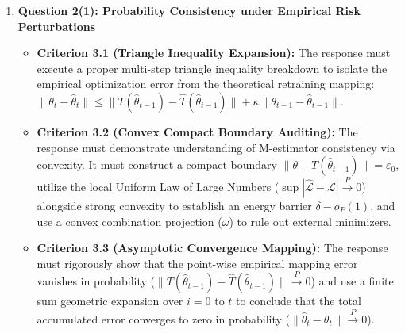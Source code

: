 \documentclass[../../../main.tex]{subfiles}
\begin{document}
\begin{msbproblem}
\begin{gradingscheme}
\begin{enumerate}[label=\arabic*.]
\item \textbf{Question 2(1): Probability Consistency under Empirical Risk Perturbations}
\begin{itemize}
\item \textbf{Criterion 3.1 (Triangle Inequality Expansion):} The response must execute a proper multi-step triangle inequality breakdown to isolate the empirical optimization error from the theoretical retraining mapping: $\|\theta_t-\widehat\theta_t\| \le \|T(\widehat\theta_{t-1})-\widehat T(\widehat\theta_{t-1})\| + \kappa\|\theta_{t-1}-\widehat\theta_{t-1}\|$.
\item \textbf{Criterion 3.2 (Convex Compact Boundary Auditing):} The response must demonstrate understanding of M-estimator consistency via convexity. It must construct a compact boundary $\|\theta-T(\widehat\theta_{t-1})\|=\varepsilon_0$, utilize the local Uniform Law of Large Numbers ($\sup |\widehat{\mathcal{L}} - \mathcal{L}| \xrightarrow{P}0$) alongside strong convexity to establish an energy barrier $\delta - o_P(1)$, and use a convex combination projection ($\omega$) to rule out external minimizers.
\item \textbf{Criterion 3.3 (Asymptotic Convergence Mapping):} The response must rigorously show that the point-wise empirical mapping error vanishes in probability ($\|T(\widehat\theta_{t-1})-\widehat T(\widehat\theta_{t-1})\| \xrightarrow{P}0$) and use a finite sum geometric expansion over $i=0$ to $t$ to conclude that the total accumulated error converges to zero in probability ($\|\widehat\theta_t-\theta_t\| \xrightarrow{P}0$).
\end{itemize}


\end{enumerate}
\end{gradingscheme}
\end{msbproblem}
\end{document}
